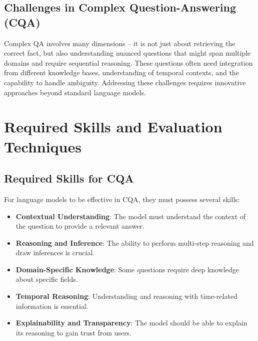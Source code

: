 \documentclass{article}
\begin{document}
\subsection{Challenges in Complex Question-Answering (CQA)}
Complex QA involves many dimensions – it is not just about retrieving the correct fact, but also understanding nuanced questions that might span multiple domains and require sequential reasoning. These questions often need integration from different knowledge bases, understanding of temporal contexts, and the capability to handle ambiguity. Addressing these challenges requires innovative approaches beyond standard language models.

\section{Required Skills and Evaluation Techniques}
\label{sec:skills_evaluation}

\subsection{Required Skills for CQA}
For language models to be effective in CQA, they must possess several skills:
\begin{itemize}
    \item \textbf{Contextual Understanding}: The model must understand the context of the question to provide a relevant answer.
    \item \textbf{Reasoning and Inference}: The ability to perform multi-step reasoning and draw inferences is crucial.
    \item \textbf{Domain-Specific Knowledge}: Some questions require deep knowledge about specific fields.
    \item \textbf{Temporal Reasoning}: Understanding and reasoning with time-related information is essential.
    \item \textbf{Explainability and Transparency}: The model should be able to explain its reasoning to gain trust from users.
\end{itemize}
\end{document}
